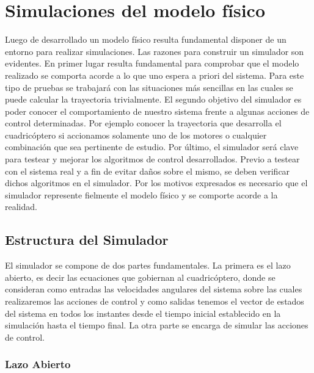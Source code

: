\documentclass[main]{subfiles}
\begin{document}
\chapter{Simulaciones del modelo f\'isico}
\label{chap:simulador}

Luego de desarrollado un modelo f\'isico resulta fundamental disponer de un entorno para realizar simulaciones. Las razones para construir un simulador son evidentes. En primer lugar resulta fundamental para comprobar que el modelo realizado se comporta acorde a lo que uno espera a priori del sistema. Para este tipo de pruebas se trabajar\'a con las situaciones m\'as sencillas en las cuales se puede calcular la trayectoria trivialmente. El segundo objetivo del simulador es poder conocer el comportamiento de nuestro sistema frente a algunas acciones de control determinadas. Por ejemplo conocer la trayectoria que desarrolla el cuadric\'optero si accionamos solamente uno de los motores o cualquier combinaci\'on que sea pertinente de estudio. Por \'ultimo, el simulador ser\'a clave para testear y mejorar los algoritmos de control desarrollados. Previo a testear con el sistema real y a fin de evitar da\~nos sobre el mismo, se deben verificar dichos algoritmos en el simulador. Por los motivos expresados es necesario que el simulador represente fielmente el modelo f\'isico y se comporte acorde a la realidad. \\

\section{Estructura del Simulador}


El simulador se compone de dos partes fundamentales. La primera es el lazo abierto, es decir las ecuaciones que gobiernan al cuadric\'optero, donde se consideran como entradas las velocidades angulares del sistema sobre las cuales realizaremos las acciones de control y como salidas tenemos el vector de estados del sistema en todos los instantes desde el tiempo inicial establecido en la simulaci\'on hasta el tiempo final. La otra parte se encarga de simular las acciones de control.

\subsection{Lazo Abierto}
\end{document}
